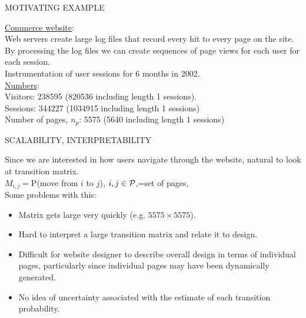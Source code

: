 \documentclass{report}
\newcommand{\head}[1]
{
  \begin{center}
      {\huge {\color{blue} #1}}
    \end{center}
  }
\begin{document}
\newpage \head{MOTIVATING EXAMPLE}
\underline{Commerce website}:\\ %
Web servers create large log files that record
every hit to every page on the site.\\
By processing the log files we can create sequences of page
views for each user for each session.\\
Instrumentation of user sessions for 6 months in 2002.\\
\underline{Numbers}:\\
Visitors: 238595 (820536 including length 1 sessions).\\
Sessions: 344227 (1034915 including length 1 sessions)\\
Number of pages, $n_p$: 5575 (5640 including length 1 sessions)

\newpage \head{SCALABILITY, INTERPRETABILITY} Since we are interested in how
users navigate through the website, natural to look at transition
matrix.\\
$M_{i,j}=$P(move from $i$ to $j$), $i,j \in {\cal P}$,=set of pages, \\
Some problems with this:
\begin{itemize}
\item Matrix gets large very quickly (e.g. $5575 \times 5575$).
\item Hard to interpret a large transition matrix and relate it to design.
\item Difficult for website designer to describe overall design in
  terms of individual pages, particularly since individual
  pages may have been dynamically generated.
\item No idea of uncertainty associated with the estimate of each transition probability.
\end{itemize}
\end{document}
